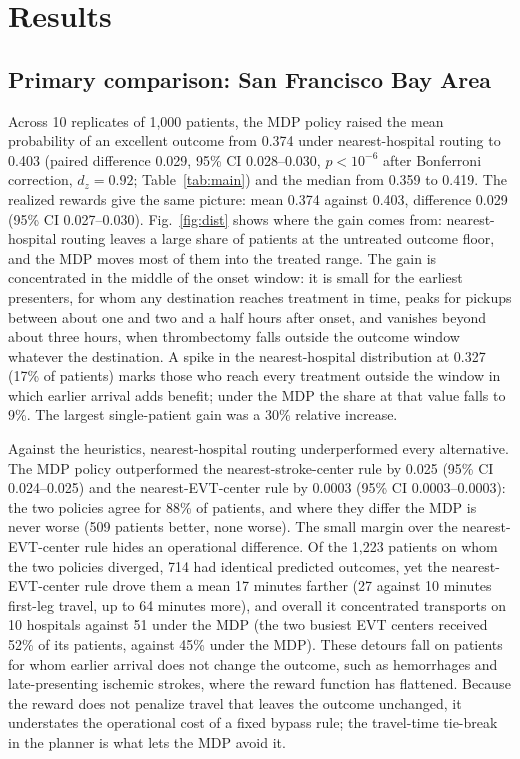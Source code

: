 \section{Results}
\label{sec:results}

\subsection{Primary comparison: San Francisco Bay Area}
Across 10 replicates of 1,000 patients, the MDP policy raised the mean probability of an excellent outcome from 0.374 under nearest-hospital routing to 0.403 (paired difference 0.029, 95\% CI 0.028--0.030, $p < 10^{-6}$ after Bonferroni correction, $d_z = 0.92$; Table~\ref{tab:main}) and the median from 0.359 to 0.419. The realized rewards give the same picture: mean 0.374 against 0.403, difference 0.029 (95\% CI 0.027--0.030). Fig.~\ref{fig:dist} shows where the gain comes from: nearest-hospital routing leaves a large share of patients at the untreated outcome floor, and the MDP moves most of them into the treated range. The gain is concentrated in the middle of the onset window: it is small for the earliest presenters, for whom any destination reaches treatment in time, peaks for pickups between about one and two and a half hours after onset, and vanishes beyond about three hours, when thrombectomy falls outside the outcome window whatever the destination. A spike in the nearest-hospital distribution at 0.327 (17\% of patients) marks those who reach every treatment outside the window in which earlier arrival adds benefit; under the MDP the share at that value falls to 9\%. The largest single-patient gain was a 30\% relative increase.

Against the heuristics, nearest-hospital routing underperformed every alternative. The MDP policy outperformed the nearest-stroke-center rule by 0.025 (95\% CI 0.024--0.025) and the nearest-EVT-center rule by 0.0003 (95\% CI 0.0003--0.0003): the two policies agree for 88\% of patients, and where they differ the MDP is never worse (509 patients better, none worse). The small margin over the nearest-EVT-center rule hides an operational difference. Of the 1,223 patients on whom the two policies diverged, 714 had identical predicted outcomes, yet the nearest-EVT-center rule drove them a mean 17 minutes farther (27 against 10 minutes first-leg travel, up to 64 minutes more), and overall it concentrated transports on 10 hospitals against 51 under the MDP (the two busiest EVT centers received 52\% of its patients, against 45\% under the MDP). These detours fall on patients for whom earlier arrival does not change the outcome, such as hemorrhages and late-presenting ischemic strokes, where the reward function has flattened. Because the reward does not penalize travel that leaves the outcome unchanged, it understates the operational cost of a fixed bypass rule; the travel-time tie-break in the planner is what lets the MDP avoid it.

